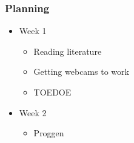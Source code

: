 \documentclass{beamer}
\begin{document}
\frame
{
  \frametitle{Planning}
  \begin{itemize}
    \item Week 1
      \begin{itemize}
        \item Reading literature
        \item Getting webcams to work
        \item TOEDOE
      \end{itemize}
    \item Week 2
      \begin{itemize}
        \item Proggen
      \end{itemize}
  \end{itemize}
}
\end{document}
